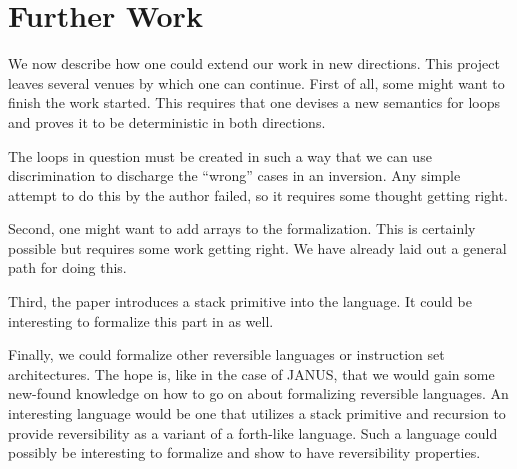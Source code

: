 \chapter{Further Work}

We now describe how one could extend our work in new directions. This
project leaves several venues by which one can continue. First of all,
some might want to finish the work started. This requires that one
devises a new semantics for loops and proves it to be deterministic in
both directions.

The loops in question must be created in such a way that we can use
discrimination to discharge the ``wrong'' cases in an inversion. Any
simple attempt to do this by the author failed, so it requires some
thought getting right.

Second, one might want to add arrays to the formalization. This is
certainly possible but requires some work getting right. We have
already laid out a general path for doing this.

Third, the paper \cite{glueck+2008} introduces a stack primitive into
the language. It could be interesting to formalize this part in \coq{}
as well.

Finally, we could formalize other reversible languages or instruction
set architectures. The hope is, like in the case of JANUS, that we
would gain some new-found knowledge on how to go on about formalizing
reversible languages. An interesting language would be one that
utilizes a stack primitive and recursion to provide reversibility as a
variant of a forth-like language. Such a language could possibly be
interesting to formalize and show to have reversibility properties.

